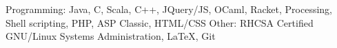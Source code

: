 \begin{cvskills}
    \cvskill
    {Programming:}
    {Java, C, Scala, C++, JQuery/JS, OCaml, Racket, Processing, Shell scripting, PHP, ASP Classic, HTML/CSS}
	\cvskill
	{Other:}
	{RHCSA Certified GNU/Linux Systems Administration, LaTeX, Git}
	\vspace{-1.5em} %
\end{cvskills}
